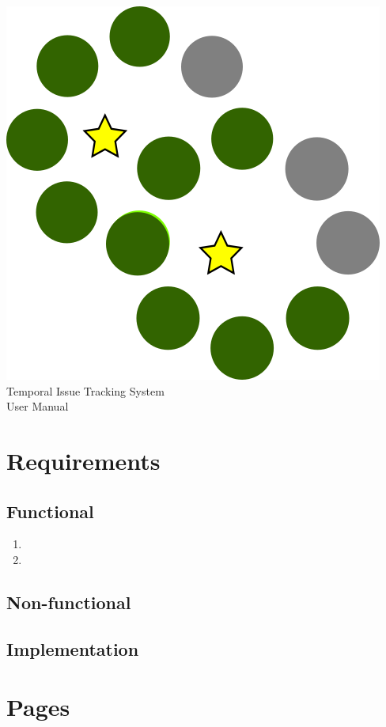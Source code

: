 \documentclass{article}
\begin{document}
\vfill
\begin{center}
    \includegraphics[scale=0.12]{../img/favicon.png}\\
{\huge Temporal Issue Tracking System\\}
{\Large User Manual}
\end{center}
\vfill
\newpage
\tableofcontents
\newpage
\setcounter{page}{3}
\section{Requirements}
\subsection{Functional}
\begin{enumerate}[label=\textbf{FR\arabic*}]
    \item
    \item
\end{enumerate}
\subsection{Non-functional}
\subsection{Implementation}
\section{Pages}
\end{document}
